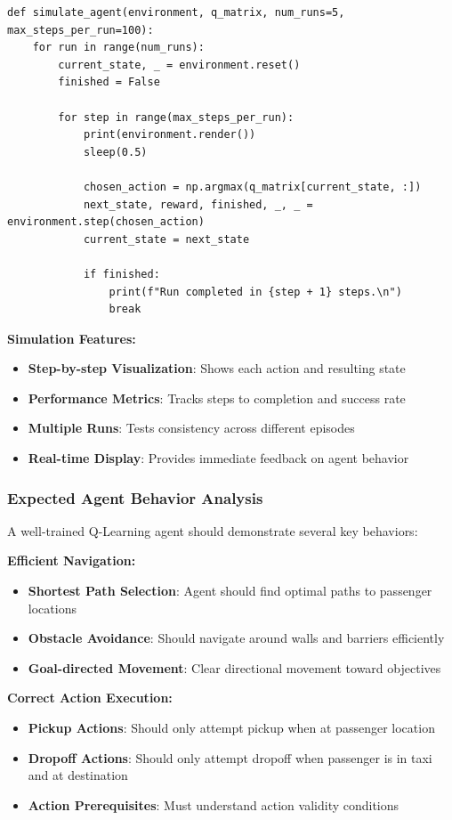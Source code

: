 \documentclass[12pt]{article}
\begin{document}
{{{\begin{verbatim}
def simulate_agent(environment, q_matrix, num_runs=5, max_steps_per_run=100):
    for run in range(num_runs):
        current_state, _ = environment.reset()
        finished = False
        
        for step in range(max_steps_per_run):            
            print(environment.render())
            sleep(0.5)  
            
            chosen_action = np.argmax(q_matrix[current_state, :])
            next_state, reward, finished, _, _ = environment.step(chosen_action)
            current_state = next_state

            if finished:
                print(f"Run completed in {step + 1} steps.\n")
                break
\end{verbatim}

\textbf{Simulation Features:}
\begin{itemize}
    \item \textbf{Step-by-step Visualization}: Shows each action and resulting state
    \item \textbf{Performance Metrics}: Tracks steps to completion and success rate
    \item \textbf{Multiple Runs}: Tests consistency across different episodes
    \item \textbf{Real-time Display}: Provides immediate feedback on agent behavior
\end{itemize}

\subsubsection{Expected Agent Behavior Analysis}

A well-trained Q-Learning agent should demonstrate several key behaviors:

\textbf{Efficient Navigation:}
\begin{itemize}
    \item \textbf{Shortest Path Selection}: Agent should find optimal paths to passenger locations
    \item \textbf{Obstacle Avoidance}: Should navigate around walls and barriers efficiently
    \item \textbf{Goal-directed Movement}: Clear directional movement toward objectives
\end{itemize}

\textbf{Correct Action Execution:}
\begin{itemize}
    \item \textbf{Pickup Actions}: Should only attempt pickup when at passenger location
    \item \textbf{Dropoff Actions}: Should only attempt dropoff when passenger is in taxi and at destination
    \item \textbf{Action Prerequisites}: Must understand action validity conditions
\end{itemize}

}}}
\end{document}
